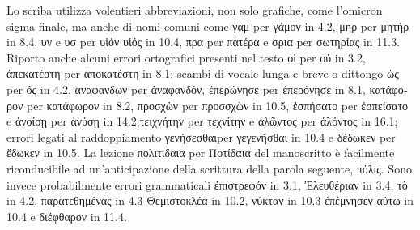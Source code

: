 Lo scriba utilizza volentieri abbreviazioni, non
solo grafiche, come l'omicron sigma finale, ma anche di nomi
comuni come \textgreek{γαμ} per \textgreek{γάμον} in
4.2, \textgreek{μηρ} per \textgreek{μητὴρ} in
8.4, \textgreek{υν} e \textgreek{υσ} per \textgreek{υἱόν υἱός} in 10.4, \textgreek{πρα} per
\textgreek{πατέρα} e
\textgreek{σρια} per \textgreek{σωτηρίας} in
11.3.
Riporto anche alcuni errori ortografici presenti nel testo
\textgreek{οἱ}
per \textgreek{οὑ} in
3.2,
\textgreek{ἀπεκατέστη} per \textgreek{ἀποκατέστη} in 8.1;
scambi di vocale lunga e breve o dittongo
\textgreek{ὡς} per \textgreek{ὃς} in
4.2,
\textgreek{αναφανδων} per \textgreek{ἀναφανδόν},
\textgreek{ἐπερώνησε} per \textgreek{ἐπερόνησε} in
8.1,
\textgreek{κατάφορον} per \textgreek{κατάφωρον} in 8.2,  \textgreek{προσχὼν} per \textgreek{προσσχὼν} in
10.5, \textgreek{ἐσπήσατο} per \textgreek{ἐσπείσατο} e
\textgreek{ἀνοίσῃ} per \textgreek{ἀνύσῃ}
in 14.2,\textgreek{τειχνήτην} per 
 \textgreek{τεχνίτην} e
\textgreek{ἁλῶντος} per
\textgreek{ἁλόντος} in 16.1; errori legati al
raddoppiamento
\textgreek{γενήσεσθαι}per \textgreek{γεγενῆσθαι} in 10.4 e  \textgreek{δέδωκεν} per \textgreek{ἔδωκεν} in 10.5. La lezione
\textgreek{πολιτιδαια} per \textgreek{Ποτίδαια} del manoscritto è facilmente
riconducibile ad un'anticipazione della scrittura della
parola seguente,
\textgreek{πόλις}. Sono invece probabilmente errori grammaticali
\textgreek{ἐπιστρεφόν}
in 3.1,
\textgreek{Ἐλευθέριαν} in 3.4, 
\textgreek{τὸ} in 4.2,
\textgreek{παρατεθημένας} in 4.3
\textgreek{Θεμιστοκλέα} in 10.2,
\textgreek{νύκταν} in 10.3
\textgreek{ἐπέμνησεν αὐτω} in 10.4 e
\textgreek{διέφθαρον} in 11.4.

